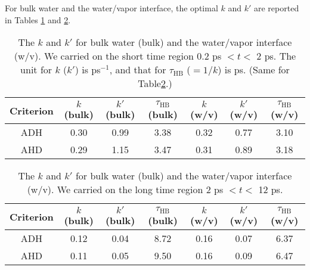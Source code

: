 For bulk water and the water/vapor interface, the optimal $k$ and $k'$ are reported in Tables 
\ref{tab:k_k_prime_128w_pure_1} and \ref{tab:k_k_prime_128w_pure_2}. 
% 
\begin{table}[htb]
\centering
\caption{\label{tab:k_k_prime_128w_pure_1} 
    The $k$ and $k'$ for bulk water (bulk) and the water/vapor interface (w/v). We carried on the short time region 0.2 ps $< t <$ 2 ps. 
    The unit for $k$ ($k'$) is ps$^{-1}$, and that for $\tau_{\text{HB}}$ ($=1/k$) is ps. (Same for Table\thinspace\ref{tab:k_k_prime_128w_pure_2}.)
} 
\begin{tabular}{ccccccc}
 Criterion & $k$  (bulk) & $k'$ (bulk) & $\tau_{\text{HB}}$ (bulk) & $k$  (w/v) & $k'$ (w/v) & $\tau_{\text{HB}}$ (w/v)\\
\hline
  ADH & 0.30  & 0.99 & 3.38  & 0.32 & 0.77 & 3.10 \\
  AHD & 0.29 & 1.15 & 3.47 & 0.31 & 0.89 & 3.18 \\
\end{tabular}
\end{table}
%
\begin{table}[htb]
\centering
\caption{\label{tab:k_k_prime_128w_pure_2} 
    The $k$ and $k'$ for bulk water (bulk) and the water/vapor interface (w/v). We carried on the long time region 2 ps $< t <$ 12 ps.
} 
\begin{tabular}{ccccccc}
 Criterion & $k$  (bulk) & $k'$ (bulk) & $\tau_{\text{HB}}$ (bulk) & $k$  (w/v) & $k'$ (w/v) & $\tau_{\text{HB}}$ (w/v)\\
\hline
  ADH & 0.12  & 0.04 & 8.72 & 0.16  & 0.07 & 6.37\\
  AHD & 0.11  & 0.05 & 9.50 & 0.16  & 0.09 & 6.47 \\
\end{tabular}
\end{table}
% 

